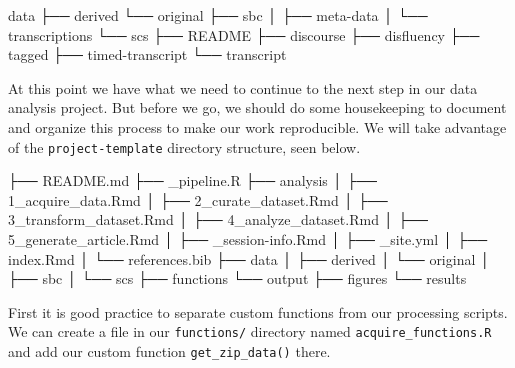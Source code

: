 \documentclass[
]{article}
\newenvironment{Shaded}{\begin{snugshade}}{\end{snugshade}}
\newcommand{\ExtensionTok}[1]{#1}
\newcommand{\NormalTok}[1]{#1}
\begin{document}
\begin{Shaded}
\begin{Highlighting}[]
\ExtensionTok{data}
\ExtensionTok{├──}\NormalTok{ derived}
\ExtensionTok{└──}\NormalTok{ original}
    \ExtensionTok{├──}\NormalTok{ sbc}
    \ExtensionTok{│}\NormalTok{   ├── meta{-}data}
    \ExtensionTok{│}\NormalTok{   └── transcriptions}
    \ExtensionTok{└──}\NormalTok{ scs}
        \ExtensionTok{├──}\NormalTok{ README}
        \ExtensionTok{├──}\NormalTok{ discourse}
        \ExtensionTok{├──}\NormalTok{ disfluency}
        \ExtensionTok{├──}\NormalTok{ tagged}
        \ExtensionTok{├──}\NormalTok{ timed{-}transcript}
        \ExtensionTok{└──}\NormalTok{ transcript}
\end{Highlighting}
\end{Shaded}

At this point we have what we need to continue to the next step in our data analysis project. But before we go, we should do some housekeeping to document and organize this process to make our work reproducible. We will take advantage of the \texttt{project-template} directory structure, seen below.

\begin{Shaded}
\begin{Highlighting}[]
\ExtensionTok{├──}\NormalTok{ README.md}
\ExtensionTok{├──}\NormalTok{ \_pipeline.R}
\ExtensionTok{├──}\NormalTok{ analysis}
\ExtensionTok{│}\NormalTok{   ├── 1\_acquire\_data.Rmd}
\ExtensionTok{│}\NormalTok{   ├── 2\_curate\_dataset.Rmd}
\ExtensionTok{│}\NormalTok{   ├── 3\_transform\_dataset.Rmd}
\ExtensionTok{│}\NormalTok{   ├── 4\_analyze\_dataset.Rmd}
\ExtensionTok{│}\NormalTok{   ├── 5\_generate\_article.Rmd}
\ExtensionTok{│}\NormalTok{   ├── \_session{-}info.Rmd}
\ExtensionTok{│}\NormalTok{   ├── \_site.yml}
\ExtensionTok{│}\NormalTok{   ├── index.Rmd}
\ExtensionTok{│}\NormalTok{   └── references.bib}
\ExtensionTok{├──}\NormalTok{ data}
\ExtensionTok{│}\NormalTok{   ├── derived}
\ExtensionTok{│}\NormalTok{   └── original}
\ExtensionTok{│}\NormalTok{       ├── sbc}
\ExtensionTok{│}\NormalTok{       └── scs}
\ExtensionTok{├──}\NormalTok{ functions}
\ExtensionTok{└──}\NormalTok{ output}
    \ExtensionTok{├──}\NormalTok{ figures}
    \ExtensionTok{└──}\NormalTok{ results}
\end{Highlighting}
\end{Shaded}

First it is good practice to separate custom functions from our processing scripts. We can create a file in our \texttt{functions/} directory named \texttt{acquire\_functions.R} and add our custom function \texttt{get\_zip\_data()} there.
\end{document}
